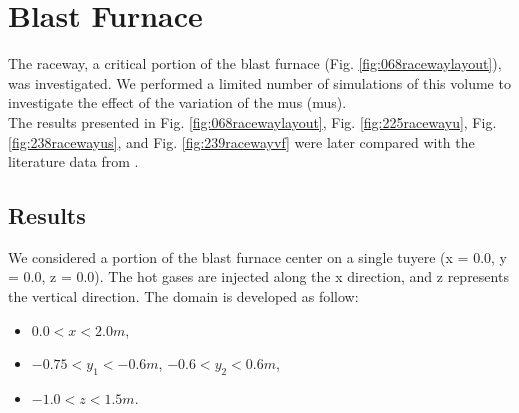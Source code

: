 
\chapter{Blast Furnace}
\label{cap:blastfurnace}


The raceway, a critical portion of the blast furnace (Fig.
\ref{fig:068racewaylayout}), was investigated.
We performed a limited number of simulations of this volume to investigate the
effect of the variation of the \acl{mus} (\acs{mus}).\\
The results presented in Fig. \ref{fig:068racewaylayout}, Fig.
\ref{fig:225racewayu}, Fig. \ref{fig:238racewayus}, and Fig.
\ref{fig:239racewayvf} were later compared with the literature data from
\citet{RefWorks:208}.



\newpage

\section{Results}
\label{sec:resultsbf}

We considered a portion of the blast furnace center on a single tuyere (x = 0.0,
y = 0.0, z = 0.0).
The hot gases are injected along the x direction, and z represents the vertical
direction.
The domain is developed as follow:
\begin{itemize}
  \item{$0.0 < x < 2.0 m$,}
  \item{$-0.75 < y_1 < -0.6 m$, $-0.6 < y_2 < 0.6 m$,}
  \item{$-1.0 < z < 1.5 m$.} 
\end{itemize}

